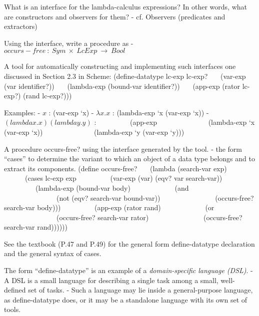 \documentclass{article}
\newcommand{\mm}{\!\!-\!\!}
\begin{document}
\begin{huge}
What is an interface for the lambda-calculus expressions? 
In other words, what are constructors and observers for them? \al
- cf. Observers (predicates and extractors) \al

Using the interface, write a procedure as \al
- $occurs\mm free \ : \ Sym \ \times \ LcExp \ \rightarrow \ Bool$


A tool for automatically constructing and implementing such interfaces
one discussed in Section 2.3 in Scheme: \al
(define-datatype lc-exp lc-exp? \al
\ \ \ (var-exp (var identifier?)) \al
\ \ \ (lambda-exp (bound-var identifier?)) \al
\ \ \ (app-exp (rator lc-exp?) (rand lc-exp?))) \al

Examples: \al
- $x$ : (var-exp `x) \al
- $\lambda x. x$ : (lambda-exp `x (var-exp `x)) \al
- $(lambda x. x) (lambda y.y)$ : \al
\ \ \ \ \ \ \ \ \ (app-exp \al
\ \ \ \ \ \ \ \ \ \ \ \ \ \ (lambda-exp `x (var-exp `x)) \al
\ \ \ \ \ \ \ \ \ \ \ \ \ \ (lambda-exp `y (var-exp `y)))


A procedure occurs-free? using the interface generated by the tool. \al
- the form ``cases'' to determine the variant to which an object of a data type 
belongs and to extract its components. \al
(define occurs-free? \al
\ \ \ (lambda (search-var exp) \al
\ \ \ \ \ \ (cases lc-exp exp \al
\ \ \ \ \ \ \ \ \ (var-exp (var) (eqv? var search-var)) \al
\ \ \ \ \ \ \ \ \ (lambda-exp (bound-var body) \al
\ \ \ \ \ \ \ \ \ \ \ \ (and \al
\ \ \ \ \ \ \ \ \ \ \ \ \ \ \ (not (eqv? search-var bound-var)) \al
\ \ \ \ \ \ \ \ \ \ \ \ \ \ \ (occurs-free? search-var body))) \al
\ \ \ \ \ \ \ \ \ (app-exp (rator rand) \al
\ \ \ \ \ \ \ \ \ \ \ \ (or \al
\ \ \ \ \ \ \ \ \ \ \ \ \ \ \ (occurs-free? search-var rator) \al
\ \ \ \ \ \ \ \ \ \ \ \ \ \ \ (occurs-free? search-var rand))))))


See the textbook (P.47 and P.49) for the general form define-datatype
declaration and the general syntax of cases. \al

The form ``define-datatype'' is an example of a {\it domain-specific 
language (DSL)}. \al
- A DSL is a small language for describing a single task among a small,
well-defined set of tasks.  \al
- Such a language may lie inside a general-purpose language, 
as define-datatype does, or 
it may be a standalone language with its own set of tools. 


\end{huge}
\end{document}
